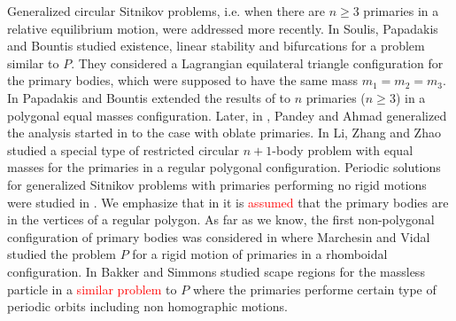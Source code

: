 \documentclass[smallcondensed]{svjour3}
\begin{document}
Generalized circular Sitnikov problems, i.e. when there are $n\geq 3$ primaries in a relative equilibrium motion,   were addressed more recently.
In \cite{soulis2008periodic} Soulis, Papadakis and Bountis studied existence, linear stability and bifurcations for a problem similar to $P$. They considered  a Lagrangian equilateral triangle configuration for the primary bodies, which were supposed to have the same mass $m_1=m_2=m_3$. In \cite{bountis2009stability} Papadakis and Bountis extended the results of \cite{soulis2008periodic} to $n$ primaries ($n\geq 3$) in a polygonal equal masses configuration. Later,  in \cite{pandey2013periodic}, Pandey and Ahmad generalized  the analysis started in \cite{soulis2008periodic} to the case with oblate primaries.
In \cite{li2013characterization} Li, Zhang and Zhao studied a special type of
restricted circular $n+1$-body problem  with equal masses for the primaries in a regular polygonal configuration. Periodic solutions for generalized Sitnikov problems with primaries performing  no rigid motions were studied in \cite{pustyl1990certain,rivera2013periodic}. We emphasize that in
\cite{bountis2009stability,li2013characterization,pandey2013periodic,pustyl1990certain,rivera2013periodic,soulis2008periodic} it is \textcolor{red}{assumed} that
the primary bodies are in the vertices of a regular polygon.
As far as we know, the first non-polygonal configuration of primary bodies was considered in \cite{marchesin2013spatial} where  Marchesin and Vidal studied the problem $P$ for a rigid motion  of primaries in a  rhomboidal configuration.
 In \cite{bakker2015separating} Bakker and Simmons studied scape regions for the massless particle in a  \textcolor{red}{similar problem} to $P$ where the primaries performe certain type of periodic orbits including non homographic motions.
\end{document}
